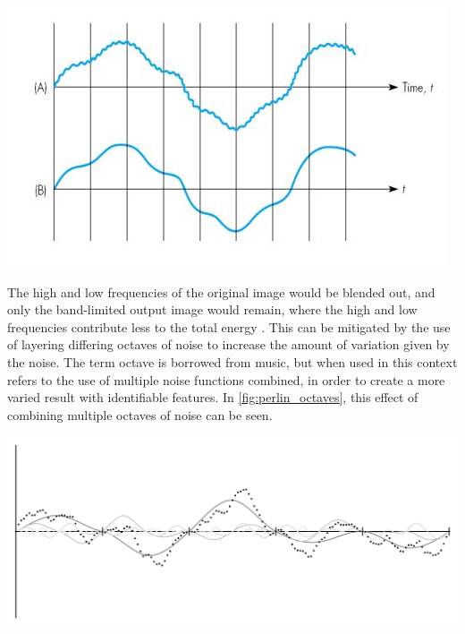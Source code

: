 \documentclass[10pt]{report}
\begin{document}
			\begin{minipage}{\textwidth}
				\centering
				\includegraphics[scale=.5]{bandlimiting-filter}
				\label{fig:bandlimit}
			\end{minipage}
			
			The high and low frequencies of the original image would be blended out, and only the band-limited output image would remain, where the high and low frequencies contribute less to the total energy \cite{making-noise}. This can be mitigated by the use of layering differing octaves of noise to increase the amount of variation given by the noise. The term octave is borrowed from music, but when used in this context refers to the use of multiple noise functions combined, in order to create a more varied result with identifiable features. In \autoref{fig:perlin_octaves}, this effect of combining multiple octaves of noise can be seen.
			
			\begin{minipage}{\textwidth}
				\centering
				\includegraphics[scale=.4]{perlin_octaves}
				\label{fig:perlin_octaves}
			\end{minipage}
	
\end{document}

